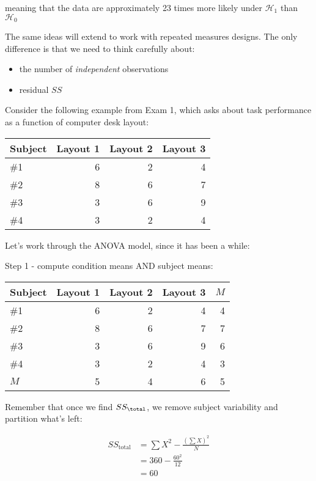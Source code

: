 \documentclass[portrait,footrule,17pt]{foils}
\begin{document}
meaning that the data are approximately 23 times more likely under \(\mathcal{H}_1\) than \(\mathcal{H}_0\)

\label{sec:org660769e}

The same ideas will extend to work with repeated measures designs. The only difference is that we need to think carefully about:

\begin{itemize}
\item the number of \emph{independent} observations
\item residual \(SS\)
\end{itemize}

\label{sec:org6b5c9b4}
Consider the following example from Exam 1, which asks about task performance as a function of computer desk layout:

\begin{center}
\begin{tabular}{lrrr}
Subject & Layout 1 & Layout 2 & Layout 3\\
\hline
\#1 & 6 & 2 & 4\\
\#2 & 8 & 6 & 7\\
\#3 & 3 & 6 & 9\\
\#4 & 3 & 2 & 4\\
\end{tabular}
\end{center}

Let's work through the ANOVA model, since it has been a while:

Step 1 - compute condition means AND subject means:

\begin{center}
\begin{tabular}{lrrrr}
Subject & Layout 1 & Layout 2 & Layout 3 & \(M\)\\
\hline
\#1 & 6 & 2 & 4 & 4\\
\#2 & 8 & 6 & 7 & 7\\
\#3 & 3 & 6 & 9 & 6\\
\#4 & 3 & 2 & 4 & 3\\
\hline
\(M\) & 5 & 4 & 6 & 5\\
\end{tabular}
\end{center}

\foilhead[-1cm]{}
\label{sec:org6b6f38a}
Remember that once we find \(SS_{\total}\), we remove subject variability and partition what's left:

\begin{align*}
SS_{\text{total}} &= \sum X^2-\frac{(\sum X)^2}{N}\\
&= 360 - \frac{60^2}{12}\\
&= 60
\end{align*}
\end{document}
